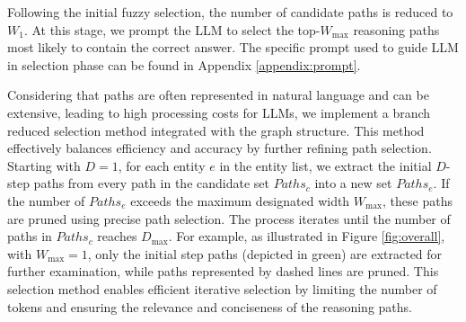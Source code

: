 Following the initial fuzzy selection, the number of candidate paths is reduced to $W_1$. At this stage, we prompt the LLM to select the top-$W_{\max}$ reasoning paths most likely to contain the correct answer. The specific prompt used to guide LLM in selection phase can be found in Appendix \ref{appendix:prompt}.



Considering that paths are often represented in natural language and can be extensive, leading to high processing costs for LLMs, we implement a branch reduced selection method integrated with the graph structure. This method effectively balances efficiency and accuracy by further refining path selection. Starting with $D = 1$, for each entity $e$ in the entity list, we extract the initial $D$-step paths from every path in the candidate set $Paths_c$ into a new set $Paths_e$. If the number of $Paths_e$ exceeds the maximum designated width $W_{\max}$, these paths are pruned using precise path selection. The process iterates until the number of paths in $Paths_c$ reaches $D_{\max}$. For example, as illustrated in Figure \ref{fig:overall}, with $W_{\max} = 1$, only the initial step paths (depicted in green) are extracted for further examination, while paths represented by dashed lines are pruned. This selection method enables efficient iterative selection by limiting the number of tokens and ensuring the relevance and conciseness of the reasoning paths.



